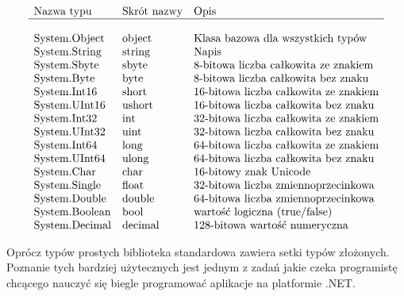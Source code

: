 \begin{center}
$$\begin{array}{lll}
\mbox{Nazwa typu} & \mbox{Skrót nazwy} & \mbox{Opis} \\
\hline \\
\mbox{System.Object}  & \mbox{object} & \mbox{Klasa bazowa dla wszystkich typów} \\
\mbox{System.String}  & \mbox{string} & \mbox{Napis} \\ 
\mbox{System.Sbyte}   & \mbox{sbyte}  & \mbox{8-bitowa liczba całkowita ze znakiem}  \\
\mbox{System.Byte}    & \mbox{byte}   & \mbox{8-bitowa liczba całkowita bez znaku}   \\
\mbox{System.Int16}   & \mbox{short}  & \mbox{16-bitowa liczba całkowita ze znakiem} \\
\mbox{System.UInt16}  & \mbox{ushort} & \mbox{16-bitowa liczba całkowita bez znaku} \\
\mbox{System.Int32}   & \mbox{int}    & \mbox{32-bitowa liczba całkowita ze znakiem} \\
\mbox{System.UInt32}  & \mbox{uint}   & \mbox{32-bitowa liczba całkowita bez znaku} \\
\mbox{System.Int64}   & \mbox{long}   & \mbox{64-bitowa liczba całkowita ze znakiem} \\
\mbox{System.UInt64}  & \mbox{ulong}  & \mbox{64-bitowa liczba całkowita bez znaku} \\
\mbox{System.Char}    & \mbox{char}   & \mbox{16-bitowy znak Unicode} \\
\mbox{System.Single}  & \mbox{float}  & \mbox{32-bitowa liczba zmiennoprzecinkowa} \\ 
\mbox{System.Double}  & \mbox{double} & \mbox{64-bitowa liczba zmiennoprzecinkowa} \\ 
\mbox{System.Boolean} & \mbox{bool}   & \mbox{wartość logiczna (true/false)} \\
\mbox{System.Decimal} & \mbox{decimal} & \mbox{128-bitowa wartość numeryczna}
\end{array}$$
\end{center}

Oprócz typów prostych biblioteka standardowa zawiera setki typów złożonych. Poznanie 
tych bardziej użytecznych jest jednym z zadań jakie czeka programistę chcącego nauczyć się
biegle programować aplikacje na platformie .NET.
